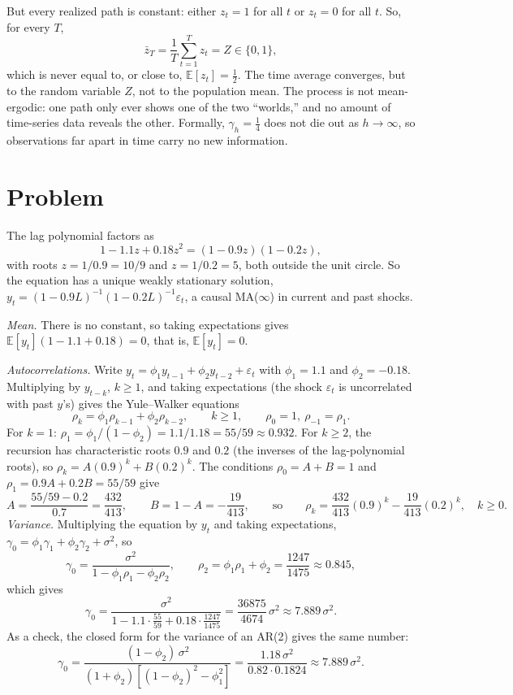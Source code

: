 \documentclass[11pt]{article}
\newcommand{\E}{\mathbb{E}}
\newcounter{problem}
\renewcommand{\theproblem}{\arabic{problem}}
\newcommand{\problem}{
	\stepcounter{problem}
	\section*{Problem \theproblem}
}
\begin{document}
But every realized path is constant: either $z_t=1$ for all $t$ or $z_t=0$ for all $t$. So, for every $T$,
\[
\bar z_T = \frac1T\sum_{t=1}^Tz_t = Z\in\{0,1\},
\]
which is never equal to, or close to, $\E[z_t]=\frac12$. The time average converges, but to the random variable $Z$, not to the population mean. The process is not mean-ergodic: one path only ever shows one of the two ``worlds,'' and no amount of time-series data reveals the other. Formally, $\gamma_h=\frac14$ does not die out as $h\to\infty$, so observations far apart in time carry no new information.

\problem

The lag polynomial factors as
\[
1-1.1z+0.18z^2 = (1-0.9z)(1-0.2z),
\]
with roots $z=1/0.9=10/9$ and $z=1/0.2=5$, both outside the unit circle. So the equation has a unique weakly stationary solution, $y_t = (1-0.9L)^{-1}(1-0.2L)^{-1}\varepsilon_t$, a causal MA($\infty$) in current and past shocks.

\emph{Mean.} There is no constant, so taking expectations gives $\E[y_t](1-1.1+0.18)=0$, that is, $\E[y_t]=0$.

\emph{Autocorrelations.} Write $y_t = \phi_1y_{t-1}+\phi_2y_{t-2}+\varepsilon_t$ with $\phi_1=1.1$ and $\phi_2=-0.18$. Multiplying by $y_{t-k}$, $k\ge1$, and taking expectations (the shock $\varepsilon_t$ is uncorrelated with past $y$'s) gives the Yule--Walker equations
\[
\rho_k = \phi_1\rho_{k-1} + \phi_2\rho_{k-2},\qquad k\ge 1,\qquad \rho_0=1,\ \rho_{-1}=\rho_1 .
\]
For $k=1$: $\rho_1 = \phi_1/(1-\phi_2) = 1.1/1.18 = 55/59\approx0.932$. For $k\ge2$, the recursion has characteristic roots $0.9$ and $0.2$ (the inverses of the lag-polynomial roots), so $\rho_k = A(0.9)^k + B(0.2)^k$. The conditions $\rho_0 = A+B = 1$ and $\rho_1 = 0.9A+0.2B = 55/59$ give
\[
A = \frac{55/59-0.2}{0.7} = \frac{432}{413},\qquad B = 1-A = -\frac{19}{413},
\qquad\text{so}\qquad
\rho_k = \frac{432}{413}(0.9)^k - \frac{19}{413}(0.2)^k,\quad k\ge0 .
\]
\emph{Variance.} Multiplying the equation by $y_t$ and taking expectations, $\gamma_0 = \phi_1\gamma_1 + \phi_2\gamma_2 + \sigma^2$, so
\[
\gamma_0 = \frac{\sigma^2}{1-\phi_1\rho_1-\phi_2\rho_2},\qquad \rho_2 = \phi_1\rho_1+\phi_2 = \frac{1247}{1475}\approx 0.845,
\]
which gives
\[
\gamma_0 = \frac{\sigma^2}{1-1.1\cdot\frac{55}{59}+0.18\cdot\frac{1247}{1475}} = \frac{36875}{4674}\,\sigma^2\approx 7.889\,\sigma^2 .
\]
As a check, the closed form for the variance of an AR(2) gives the same number:
\[
\gamma_0 = \frac{(1-\phi_2)\,\sigma^2}{(1+\phi_2)\left[(1-\phi_2)^2-\phi_1^2\right]} = \frac{1.18\,\sigma^2}{0.82\cdot 0.1824}\approx 7.889\,\sigma^2 .
\]
\end{document}
